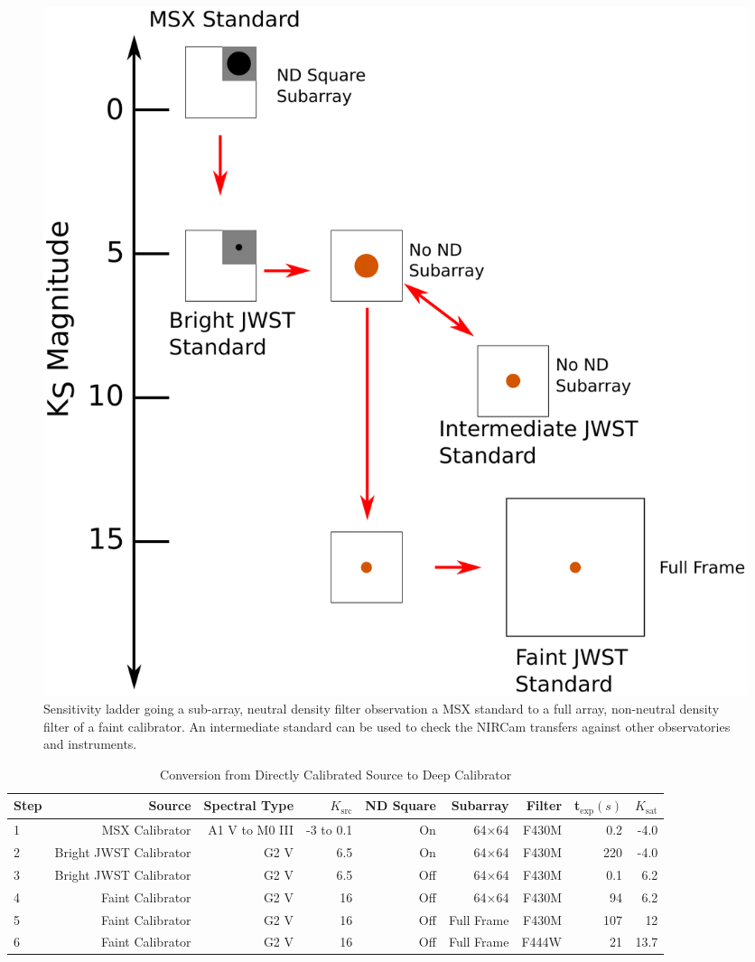 \documentclass{aastex6}
\begin{document}
\begin{figure}[!t]
\centering
\includegraphics[width=.55\columnwidth]{flux_ladder.pdf}
\caption{Sensitivity ladder going a sub-array, neutral density filter observation a MSX standard to a full array, non-neutral density filter of a faint calibrator.
An intermediate standard can be used to check the NIRCam transfers against other observatories and instruments.}\label{fig:sensitivityLadder}
\end{figure}

\begin{table}[!b]
\centering
\caption{Conversion from Directly Calibrated Source to Deep Calibrator}\label{tab:conversionSteps}
\begin{tabular}{lrrrrrrrr}
\hline \hline
Step		& Source						& Spectral Type	& $K_\mathrm{src}$		& ND Square		& Subarray	& Filter & t$_\mathrm{exp} (s) $ &$K_\mathrm{sat}$\\
\hline \hline
1		& MSX Calibrator\tablenotemark{a}	& A1 V to M0 III		& -3 to 0.1		& On	&	64$\times$64	& F430M &  0.2 & -4.0 \\
2		& Bright JWST Calibrator			& G2 V			& 6.5	  		& On &	64$\times$64	& F430M &  220 & -4.0 \\
3		& Bright JWST Calibrator			& G2 V			& 6.5  		& Off &	64$\times$64	& F430M &  0.1 & 6.2 \\
4		& Faint Calibrator				& G2 V			& 16 			& Off &	64$\times$64	& F430M &  94 & 6.2 \\
5		& Faint Calibrator				& G2 V			& 16 			& Off &	Full Frame	& F430M &  107 & 12 \\
6		& Faint Calibrator				& G2 V			& 16 			& Off &	Full Frame  	& F444W &  21 & 13.7 \\
\hline
\end{tabular}
\vspace{0.05in}
\end{table}
\end{document}
